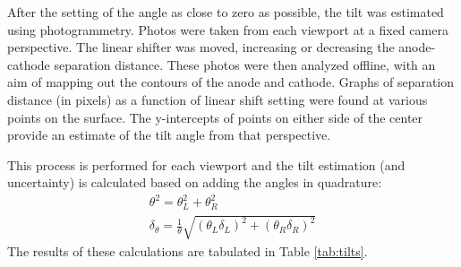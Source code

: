 After the setting of the angle as close to zero as possible, the tilt was estimated using photogrammetry.
Photos were taken from each viewport at a fixed camera perspective.
The linear shifter was moved, increasing or decreasing the anode-cathode separation distance.
These photos were then analyzed offline, with an aim of mapping out the contours of the anode and cathode.
Graphs of separation distance (in pixels) as a function of linear shift setting were found at various points on the surface.
The y-intercepts of points on either side of the center provide an estimate of the tilt angle from that perspective.

This process is performed for each viewport and the tilt estimation (and uncertainty) is calculated based on adding the angles in quadrature:
\begin{align}
    \theta^2 = \theta_L^2 + \theta_R^2\\
    \delta_\theta = \frac{1}{\theta} \sqrt{(\theta_L\delta_L)^2 + (\theta_R \delta_R)^2}
    \label{eq:theta_error}
\end{align}
The results of these calculations are tabulated in Table \ref{tab:tilts}.


